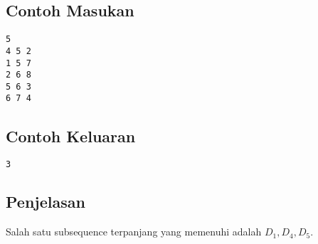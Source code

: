\documentclass{article}
\begin{document}
\begin{multicols}{2}
\subsection*{Contoh Masukan}
\begin{lstlisting}
5
4 5 2
1 5 7
2 6 8
5 6 3
6 7 4

\end{lstlisting}
\columnbreak
\subsection*{Contoh Keluaran}
\begin{lstlisting}
3
\end{lstlisting}
\vfill
\null
\end{multicols}

\subsection*{Penjelasan}


Salah satu subsequence terpanjang yang memenuhi adalah $D_1, D_4, D_5$.
\end{document}
